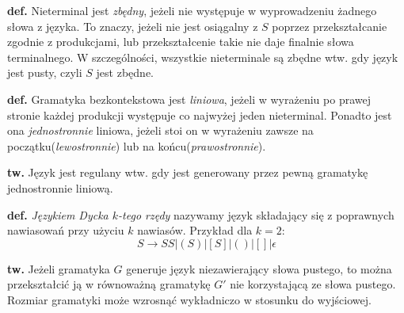 \documentclass[draft]{article}
\newcommand{\tw}{\textbf{tw. }}
\newcommand{\deff}{\textbf{def. }}
\begin{document}
	\deff Nieterminal jest \textit{zbędny}, jeżeli nie występuje w wyprowadzeniu żadnego słowa z języka. To znaczy, jeżeli nie jest osiągalny z $S$ poprzez przekształcanie zgodnie z produkcjami, lub przekształcenie takie nie daje finalnie słowa terminalnego. W szczególności, wszystkie nieterminale są zbędne wtw. gdy język jest pusty, czyli $S$ jest zbędne.
	
	\deff Gramatyka bezkontekstowa jest \textit{liniowa}, jeżeli w wyrażeniu po prawej stronie każdej produkcji występuje co najwyżej jeden nieterminal. Ponadto jest ona \textit{jednostronnie} liniowa, jeżeli stoi on w wyrażeniu zawsze na początku(\textit{lewostronnie}) lub na końcu(\textit{prawostronnie}).
	
	\tw Język jest regulany wtw. gdy jest generowany przez pewną gramatykę jednostronnie liniową.
	
	\deff \textit{Językiem Dycka $k$-tego rzędy} nazywamy język składający się z poprawnych nawiasowań przy użyciu $k$ nawiasów. Przykład dla $k=2$:
		\[S \rightarrow SS | (S) | [S] | () | [] | \epsilon \]

	\tw Jeżeli gramatyka $G$ generuje język niezawierający słowa pustego, to można przekształcić ją w równoważną gramatykę $G'$ nie korzystającą ze słowa pustego. Rozmiar gramatyki może wzrosnąć wykładniczo w stosunku do wyjściowej.
\end{document}
